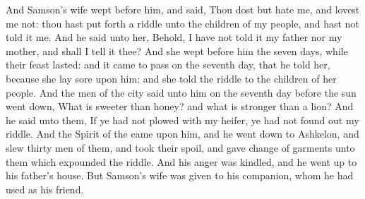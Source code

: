 \begin{biblechapter}
\verse And Samson's wife wept before him, and said, Thou dost but hate me, and lovest me not: thou hast put forth a riddle unto the children of my people, and hast not told it me. And he said unto her, Behold, I have not told it my father nor my mother, and shall I tell it thee?
\verse And she wept before him the seven days, while their feast lasted: and it came to pass on the seventh day, that he told her, because she lay sore upon him: and she told the riddle to the children of her people.
\verse And the men of the city said unto him on the seventh day before the sun went down, What is sweeter than honey? and what is stronger than a lion? And he said unto them, If ye had not plowed with my heifer, ye had not found out my riddle.
\verse And the Spirit of the \LORD came upon him, and he went down to Ashkelon, and slew thirty men of them, and took their spoil, and gave change of garments unto them which expounded the riddle. And his anger was kindled, and he went up to his father's house.
\verse But Samson's wife was given to his companion, whom he had used as his friend.
\end{biblechapter}

